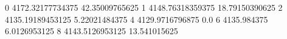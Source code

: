 0 4172.32177734375 42.35009765625
1 4148.76318359375 18.79150390625
2 4135.19189453125 5.22021484375
4 4129.9716796875 0.0
6 4135.984375 6.0126953125
8 4143.5126953125 13.541015625
